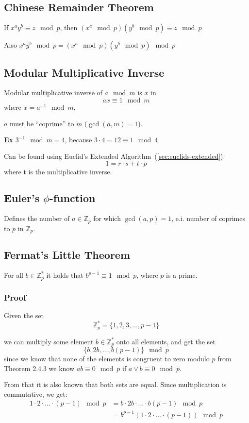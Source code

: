 \subsection{Chinese Remainder Theorem}
\label{sec:crm}
If $x^ay^b \equiv z \mod p$, then $(x^a \mod p)(y^b \mod p) \equiv z \mod p$

Also $x^ay^b \mod p = (x^a \mod p)(y^b \mod p) \mod p$

\subsection{Modular Multiplicative Inverse}
\label{sec:modular-mult-inverse}
Modular multiplicative inverse of $a \mod m$ is $x$ in
\[ ax \equiv 1 \mod m \]
where $x = a^{-1} \mod m$.

$a$ must be ``coprime'' to $m$ ($\gcd(a, m) = 1$).

\textbf{Ex} $3^{-1} \mod m = 4$, because $3 \cdot 4 = 12 \equiv 1 \mod 4$

Can be found using Euclid's Extended Algorithm~(\ref{sec:euclids-extended}).
\[ 1 = r \cdot s + t \cdot p\]
where t is the multiplicative inverse.
\subsection{Euler's $\phi$-function}
\label{sec:eulers-phi}
Defines the number of $a \in \mathbb{Z}_p$ for which $\gcd(a, p) = 1$,
e.i. number of coprimes to $p$ in $\mathbb{Z}_p$.

\subsection{Fermat's Little Theorem}
\label{sec:fermats-little}
For all $b \in \mathbb{Z}_p^*$ it holds that $b^{p-1} \equiv 1 \mod
p$, where $p$ is a prime.

\subsubsection*{Proof}
Given the set
\[ \mathbb{Z}_p^* = \{1,2,3,\ldots,p-1\} \]

we can multiply some element $b \in \mathbb{Z}_p^*$ onto all elements,
and get the set
\[ \{b,2b,\ldots,b(p-1)\} \mod p \]
since we know that none of the elements is congruent to zero modulo
$p$ from Theorem 2.4.3 we know $ab \equiv 0 \mod p$ if $a \lor b \equiv 0 \mod
p$.

From that it is also known that both sets are equal. Since
multiplication is commutative, we get:
\begin{align*}
  1 \cdot 2 \cdot \ldots \cdot (p - 1) \mod p &= b \cdot 2b \cdot \ldots
  \cdot b(p-1) \mod p\\
  &= b^{p-1}(1\cdot 2 \cdot \ldots \cdot (p - 1)) \mod p
\end{align*}

